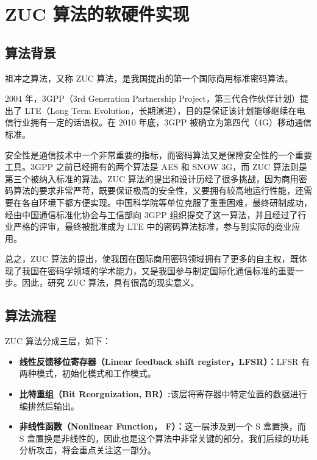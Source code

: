 
\chapter{ZUC 算法的软硬件实现}

\label{chap:zuc}

\section{算法背景} %
祖冲之算法，又称 ZUC 算法，是我国提出的第一个国际商用标准密码算法。

2004 年，3GPP（3rd Generation Partnership Project，第三代合作伙伴计划）提出了 LTE（Long Term Evolution，长期演进），目的是保证该计划能够继续在电信行业拥有一定的话语权。在 2010 年底，3GPP 被确立为第四代（4G）移动通信标准。 \cite{lte}

安全性是通信技术中一个非常重要的指标，而密码算法又是保障安全性的一个重要工具。3GPP 之前已经拥有的两个算法是 AES 和 SNOW 3G，而 ZUC 算法则是第三个被纳入标准的算法。ZUC 算法的提出和设计历经了很多挑战，因为商用密码算法的要求非常严苛，既要保证极高的安全性，又要拥有较高地运行性能，还需要在各自环境下都方便实现。中国科学院等单位克服了重重困难，最终研制成功，经由中国通信标准化协会与工信部向 3GPP 组织提交了这一算法，并且经过了行业严格的评审，最终被批准成为 LTE 中的密码算法标准，参与到实际的商业应用。 \cite{zuc_test}

总之，ZUC 算法的提出，使我国在国际商用密码领域拥有了更多的自主权，既体现了我国在密码学领域的学术能力，又是我国参与制定国际化通信标准的重要一步。因此，研究 ZUC 算法，具有很高的现实意义。

\section{算法流程} %

ZUC 算法分成三层，如下： \cite{zuc_standard}

\begin{itemize}
    \item \textbf{线性反馈移位寄存器（Linear feedback shift register，LFSR）：}LFSR 有两种模式，初始化模式和工作模式。
    \item \textbf{比特重组（Bit Reorgnization, BR）:}该层将寄存器中特定位置的数据进行编排然后输出。
    \item \textbf{非线性函数（Nonlinear Function， F）：}这一层涉及到一个 S 盒置换，而 S 盒置换是非线性的，因此也是这个算法中非常关键的部分。我们后续的功耗分析攻击，将会重点关注这一部分。
\end{itemize}


